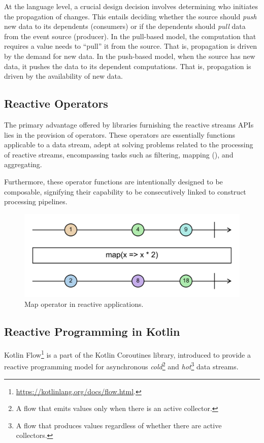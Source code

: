 At the language level, a crucial design decision involves determining who initiates the propagation of changes. This entails deciding whether the source should \textit{push} new data to its dependents (consumers) or if the dependents should \textit{pull} data from the event source (producer). In the pull-based model, the computation that requires a value needs to ``pull'' it from the source. That is, propagation is driven by the demand for new data. In the push-based model, when the source has new data, it pushes the data to its dependent computations. That is, propagation is driven by the availability of new data.

\subsection{Reactive Operators}

The primary advantage offered by libraries furnishing the reactive streams APIs lies in the provision of operators. These operators are essentially functions applicable to a data stream, adept at solving problems related to the processing of reactive streams, encompassing tasks such as filtering, mapping (), and aggregating.

Furthermore, these operator functions are intentionally designed to be composable, signifying their capability to be consecutively linked to construct processing pipelines.

\begin{figure}
    \centering
    \includegraphics[width=\linewidth]{figures/map-marble.pdf}
    \caption{Map operator in reactive applications.}
    \label{fig:reactive-map}
\end{figure}

\subsection{Reactive Programming in Kotlin}

Kotlin Flow\footnote{\url{https://kotlinlang.org/docs/flow.html}.} is a part of the Kotlin Coroutines library, introduced to provide a reactive programming model for asynchronous \textit{cold}\footnote{A flow that emits values only when there is an active collector.} and \textit{hot}\footnote{A flow that produces values regardless of whether there are active collectors.} data streams.

